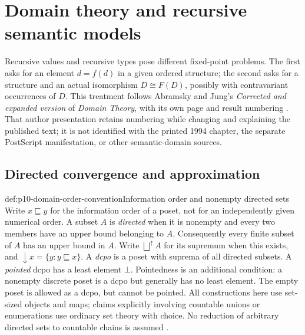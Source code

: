 \section{Domain theory and recursive semantic models}
\label{sec:p10-domain-theory-recursive-models}

Recursive values and recursive types pose different fixed-point problems.
The first asks for an element \(d=f(d)\) in a given ordered structure;
the second asks for a structure and an actual isomorphism
\(D\cong F(D)\), possibly with contravariant occurrences of \(D\).
This treatment follows Abramsky and Jung's \emph{Corrected and expanded
version} of \emph{Domain Theory}, with its own page and result numbering
\cite[pp.~1,5--7]{AbramskyJungCorrectedExpandedDomainTheory}.
That author presentation retains numbering while changing and explaining
the published text; it is not identified with the printed 1994 chapter,
the separate PostScript manifestation, or other semantic-domain sources.

\subsection{Directed convergence and approximation}

\begin{hbconvention}{def:p10-domain-order-convention}{Information order and nonempty directed sets}
Write \(x\sqsubseteq y\) for the information order of a poset, not for
an independently given numerical order. A subset \(A\) is
\emph{directed} when it is nonempty and every two members have an upper
bound belonging to \(A\). Consequently every finite subset of \(A\)
has an upper bound in \(A\). Write \(\bigsqcup^{\uparrow}A\) for its
supremum when this exists, and \(\downarrow x=\{y:y\sqsubseteq x\}\).
A \emph{dcpo} is a poset with suprema of all directed subsets. A
\emph{pointed} dcpo has a least element \(\bot\). Pointedness is an
additional condition: a nonempty discrete poset is a dcpo but generally
has no least element. The empty poset is allowed as a dcpo, but cannot
be pointed. All constructions here use set-sized objects and maps;
claims explicitly involving countable unions or enumerations use ordinary
set theory with choice. No reduction of arbitrary directed sets to
countable chains is assumed
\cite[Definitions~2.1.1,2.1.3,2.1.8,2.1.13, pp.~10--15]
{AbramskyJungCorrectedExpandedDomainTheory}.
\end{hbconvention}

